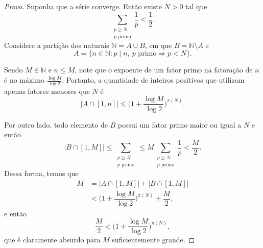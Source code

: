 \documentclass{hipatia}
\begin{document}
\begin{proof}[Prova]
Suponha que a série converge. Então existe $N>0$ tal que
\[\sum_{\substack{p \ge N \\p\text{ primo}}}\frac{1}{p}<\frac{1}{2}.\]
Considere a partição dos naturais $\mathbb{N}=A \cup B$, em que $B=\mathbb{N}\setminus A$ e
\[A=\{n \in \mathbb{N} : p \mid n,\ p\text{ primo}\Rightarrow p<N\}.\]

Sendo $M \in \mathbb{N}$ e $n \le M$, note que o expoente de um fator primo na fatoração de $n$ é no máximo $\frac{\log M}{\log 2}$. Portanto, a quantidade de inteiros positivos que utilizam apenas fatores menores que $N$ é
\[|A \cap [1,n]| \le \Big(1+\frac{\log M}{\log 2}\Big)^{\pi(N)}.\]

Por outro lado, todo elemento de $B$ possui um fator primo maior ou igual a $N$ e então
\[|B \cap [1,M]| \le \sum_{\substack{p \ge N\\p\text{ primo}}} \le M\sum_{\substack{p \ge N \\p\text{ primo}}}\frac{1}{p}<\frac{M}{2}.\]
Dessa forma, temos que
\begin{align*}
M&=|A\cap[1,M]|+|B\cap[1,M]|\\
&<\Big(1+\dfrac{\log M}{\log 2}\Big)^{\pi(N)}+\dfrac{M}{2},
\end{align*}
e então
\[\dfrac{M}{2}<\Big(1+\dfrac{\log M}{\log 2}\Big)^{\pi(N)},\]
que é claramente absurdo para $M$ suficientemente grande.
\end{proof}

\end{document}
